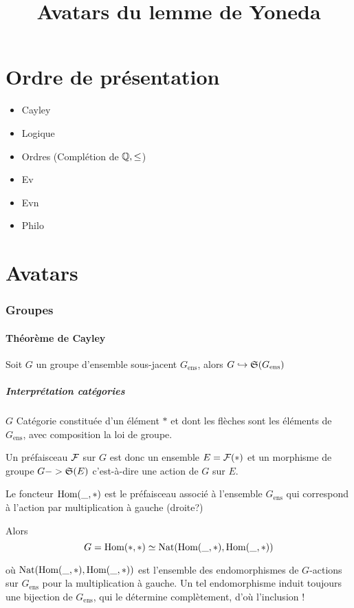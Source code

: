 \documentclass[12pt,makeidx, draft]{amsart}
\title{Avatars du lemme de Yoneda}
\DeclareMathOperator\Nat{\text{Nat}}
\begin{document}
\maketitle


\part{Ordre de présentation}
\begin{itemize}
\item Cayley
\item Logique
\item Ordres (Complétion de $\mathbb{Q},\leq$)
\item Ev
\item Evn
\item Philo
\end{itemize}

\part{Avatars}
\section{Groupes}

\subsection{Théorème de Cayley}
Soit $G$ un groupe d'ensemble sous-jacent $G_{\text{ens}}$, alors
$G \hookrightarrow \operatorname{\mathfrak{S}}(G_{\text{ens}})$


\subsubsection{Interprétation catégories}
$G$ Catégorie constituée d'un élément $*$ et dont les flèches sont les éléments de $G_{\text{ens}}$, avec composition la loi de groupe.

Un préfaisceau $\mathcal{F}$ sur $G$ est donc un ensemble $E = \mathcal{F}(*)$ et un morphisme de groupe $G -> \operatorname{\mathfrak{S}}(E)$ c'est-à-dire une action de $G$ sur $E$.

Le foncteur $\text{Hom}(\_,*)$ est le préfaisceau associé à l'ensemble $G_{\text{ens}}$ qui correspond à l'action par multiplication à gauche (droite?)

Alors
\begin{equation}
G = \Hom(*,*) \simeq \Nat(\Hom(\_,*),\Hom(\_,*))
\end{equation}

où $\Nat(\Hom(\_,*),\Hom(\_,*))$ est l'ensemble des endomorphismes de $G$-actions sur $G_{\text{ens}}$ pour la multiplication à gauche. 
Un tel endomorphisme induit toujours une bijection de $G_{\text{ens}}$, qui le détermine complètement, d'où l'inclusion !
\end{document}
